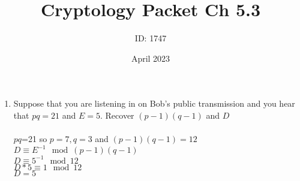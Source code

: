 \documentclass[]{article}
\date{April 2023}
\author{ID: 1747}
\title{Cryptology Packet Ch 5.3}
\begin{document}
\maketitle

\begin{enumerate}
    \item Suppose that you are listening in on Bob’s public transmission and you hear that $pq = 21$ and $E=5$. Recover $(p-1)(q-1)$ and $D$
    \\\\$pq$=21 so $p=7, q=3$ and $(p-1)(q-1)=12$
    \\$D \equiv E^{-1} \mod (p-1)(q-1)$
    \\$D \equiv 5^{-1} \mod 12$
    \\$D * 5 \equiv 1 \mod 12$
    \\$D=5$


\end{enumerate}
\end{document}
